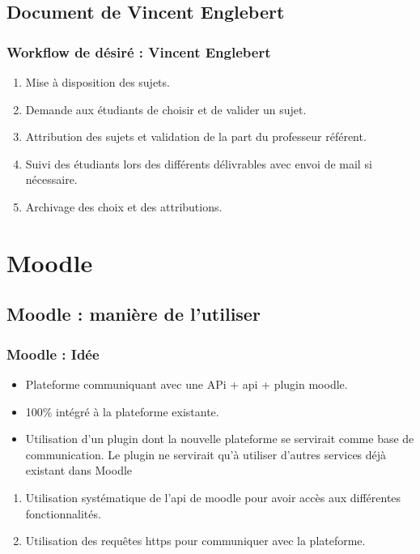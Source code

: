 \documentclass[numbering=fraction]{beamer}
\begin{document}
\subsection{Document de Vincent Englebert}
\begin{frame}
    \frametitle{Workflow de désiré : Vincent Englebert}
    \begin{enumerate}
        \item Mise à disposition des sujets.
        \item Demande aux étudiants de choisir et de valider un sujet.
        \item Attribution des sujets et validation de la part du professeur référent.
        \item Suivi des étudiants lors des différents délivrables avec envoi de mail si nécessaire.
        \item Archivage des choix et des attributions.
    \end{enumerate}


\end{frame}


\section{Moodle}
\subsection{Moodle : manière de l'utiliser}
\begin{frame}
    \frametitle{Moodle : Idée}
    \begin{itemize}
        \item Plateforme communiquant avec une APi + api + plugin moodle.
        \item 100\% intégré à la plateforme existante.
        \item Utilisation d'un plugin dont la nouvelle plateforme se servirait comme base de communication. Le plugin
        ne servirait qu'à utiliser d'autres services déjà existant dans Moodle
    \end{itemize}   
    \begin{enumerate}
        \item Utilisation systématique de l'api de moodle pour avoir accès aux différentes fonctionnalités.
        \item Utilisation des requêtes https pour communiquer avec la plateforme.
    \end{enumerate}

\end{frame}
\end{document}

